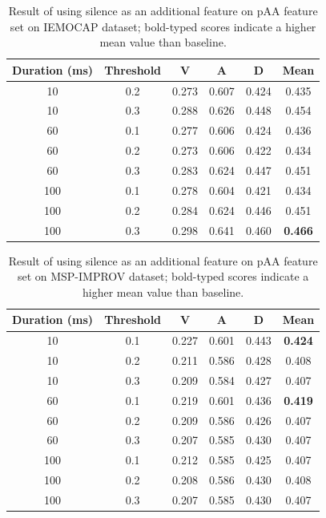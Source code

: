 \begin{table}
\caption{Result of using silence as an additional feature on pAA feature set on
IEMOCAP dataset; bold-typed scores indicate a higher mean value than baseline.}
  \begin{center}
    \begin{tabular}{c | c | c c c c}
      \hline
Duration (ms)   & Threshold &  V & A & D & Mean \\
\hline \hline
10  & 0.2   & 0.273   & 0.607   & 0.424   & 0.435 \\
10  & 0.3   & 0.288   & 0.626   & 0.448   & 0.454 \\
60  & 0.1   & 0.277   & 0.606   & 0.424   & 0.436 \\
60  & 0.2   & 0.273   & 0.606   & 0.422   & 0.434 \\
60  & 0.3   & 0.283   & 0.624   & 0.447   & 0.451 \\
100 & 0.1   & 0.278   & 0.604   & 0.421   & 0.434 \\
100 & 0.2   & 0.284   & 0.624   & 0.446   & 0.451 \\
100 & 0.3   & 0.298   & 0.641   & 0.460   & \textbf{0.466} \\
      \hline
    \end{tabular}
  \end{center}
  \label{tab:ie_saf}
\end{table}

\begin{table}
\caption{Result of using silence as an additional feature on pAA feature set on
MSP-IMPROV dataset; bold-typed scores indicate a higher mean value than
baseline.}
  \begin{center}
    \begin{tabular}{c | c | c c c c}
      \hline
Duration (ms)   & Threshold &  V & A & D & Mean \\
\hline \hline
10  & 0.1   & 0.227   & 0.601   &   0.443   &   \textbf{0.424} \\
10  & 0.2   & 0.211   & 0.586   &   0.428   &   0.408 \\
10  & 0.3   & 0.209   & 0.584   &   0.427   &   0.407 \\
60  & 0.1   & 0.219   & 0.601   &   0.436   &   \textbf{0.419} \\
60  & 0.2   & 0.209   & 0.586   &   0.426   &   0.407 \\
60  & 0.3   & 0.207   & 0.585   &   0.430   &   0.407 \\
100 & 0.1   & 0.212   & 0.585   &   0.425   &   0.407 \\
100 & 0.2   & 0.208   & 0.586   &   0.430   &   0.408 \\
100 & 0.3   & 0.207   & 0.585   &   0.430   &   0.407 \\
      \hline      
    \end{tabular}
  \end{center}
  \label{tab:msp_saf}
\end{table}

